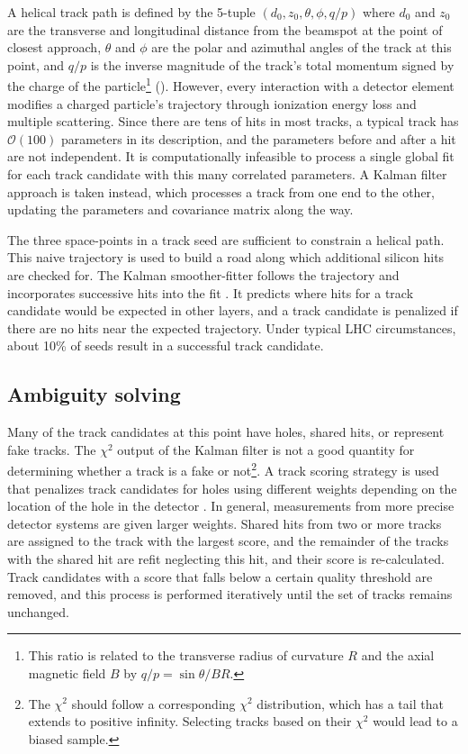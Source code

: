 A helical track path is defined by the 5-tuple
\( \left( d_0, z_0, \theta, \phi, q/p \right) \)
where $d_0$ and $z_0$ are the transverse and longitudinal distance from the beamspot at the point of closest approach, $\theta$ and $\phi$ are the polar and azimuthal angles of the track at this point, and $q/p$ is the inverse magnitude of the track's total momentum signed by the charge of the particle\footnote{This ratio is related to the transverse radius of curvature $R$ and the axial magnetic field $B$ by $q/p = \sin \theta / B R$.} ().
However, every interaction with a detector element modifies a charged particle's trajectory through ionization energy loss and multiple scattering.
Since there are tens of hits in most tracks, a typical track has $\mathcal{O}(100)$ parameters in its description, and the parameters before and after a hit are not independent.
It is computationally infeasible to process a single global fit for each track candidate with this many correlated parameters.
A Kalman filter approach is taken instead, which processes a track from one end to the other, updating the parameters and covariance matrix along the way.

The three space-points in a track seed are sufficient to constrain a helical path.
This naive trajectory is used to build a road along which additional silicon hits are checked for.
The Kalman smoother-fitter follows the trajectory and incorporates successive hits into the fit \cite{Cornelissen:2008zza}. %
It predicts where hits for a track candidate would be expected in other layers, and a track candidate is penalized if there are no hits near the expected trajectory. %
Under typical LHC circumstances, about 10\% of seeds result in a successful track candidate.

\subsection{Ambiguity solving} %

Many of the track candidates at this point have holes, shared hits, or represent fake tracks.
The $\chi^2$ output of the Kalman filter is not a good quantity for determining whether a track is a fake or not\footnote{The $\chi^2$ should follow a corresponding $\chi^2$ distribution, which has a tail that extends to positive infinity. Selecting tracks based on their $\chi^2$ would lead to a biased sample.}.
A track scoring strategy is used that penalizes track candidates for holes using different weights depending on the location of the hole in the detector \cite{Wicke:1998efw}.
In general, measurements from more precise detector systems are given larger weights.
Shared hits from two or more tracks are assigned to the track with the largest score, and the remainder of the tracks with the shared hit are refit neglecting this hit, and their score is re-calculated.
Track candidates with a score that falls below a certain quality threshold are removed, and this process is performed iteratively until the set of tracks remains unchanged.

